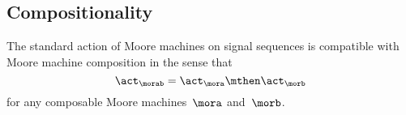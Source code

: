 
\subsection{Compositionality}

\begin{proposition}
    \label{prop:moore-action-is-a-morphism}
    The standard action of Moore machines on signal sequences is compatible with Moore machine composition in the sense that
    \begin{equation}
        \label{eq:moore-action-compositional}
        \act_{\morab} = \act_\mora \mthen \act_\morb
    \end{equation}
    for any composable Moore machines~$\mora$ and~$\morb$.
\end{proposition}

